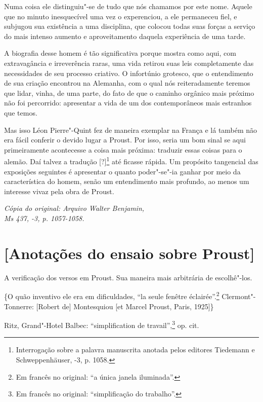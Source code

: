 Numa coisa ele distinguiu"-se de tudo que nós chamamos por este nome.
Aquele que no minuto inesquecível uma vez o experenciou, a ele
permaneceu fiel, e subjugou sua existência a uma disciplina, que colocou
todas suas forças a serviço do mais intenso aumento e aproveitamento
daquela experiência de uma tarde.

A biografia desse homem é tão significativa porque mostra como aqui, com
extravagância e irreverência raras, uma vida retirou suas leis
completamente das necessidades de seu processo criativo. O infortúnio
grotesco, que o entendimento de
sua criação encontrou na Alemanha, com o qual nós reiteradamente
teremos que lidar, vinha, de uma parte, do fato de que o caminho orgânico
mais próximo não foi percorrido: apresentar a vida de um dos
contemporâneos mais estranhos que temos.

Mas isso Léon Pierre"-Quint fez de maneira exemplar na França e lá também
não era fácil conferir o devido lugar a Proust. Por isso, seria um bom
sinal se aqui primeiramente acontecesse a coisa mais próxima: traduzir
essas coisas para o alemão. Daí talvez a tradução {[}?{]}\footnote{Interrogação sobre a palavra manuscrita anotada pelos editores
  Tiedemann e Schweppenhäuser, -3, p. 1058. \versal{[N. T.]}} até ficasse
rápida. Um propósito tangencial das exposições seguintes é apresentar o
quanto poder"-se"-ia ganhar por meio da característica do homem, senão um
entendimento mais profundo, ao menos um interesse vivaz pela obra de
Proust.


\begin{flushright}
\emph{\footnotesize{Cópia do original: Arquivo Walter Benjamin,\\ Ms 437, -3, p. 1057-1058.}}
\end{flushright}

\pagebreak

\section{{[}Anotações do ensaio sobre Proust{]}}

A verificação dos versos em Proust. Sua maneira mais arbitrária de
escolhê"-los.

\{O quão inventivo ele era em dificuldades, ``la seule fenêtre
éclairée''.\footnote{Em francês no original: ``a única janela iluminada''. \versal{[N. T.]}}
Clermont"-Tonnerre: {[}Robert de{]} Montesquiou {[}et Marcel Proust,
Paris, 1925{]}\}

Ritz, Grand"-Hotel Balbec: ``simplification de travail'',\footnote{Em francês no original: ``simplificação do trabalho''. \versal{[N. T.]}} op. cit.

